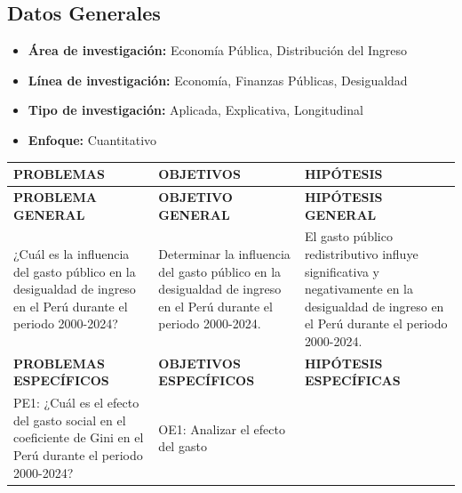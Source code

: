 \documentclass[
  man,
  floatsintext,
  longtable,
  a4paper,
  nolmodern,
  notxfonts,
  notimes,
  12pt,
  colorlinks=true,linkcolor=blue,citecolor=blue,urlcolor=blue]{apa7}
\providecommand{\tightlist}{%
  \setlength{\itemsep}{0pt}\setlength{\parskip}{0pt}}
\newcounter{none} %
\begin{document}
\subsection{Datos Generales}\label{datos-generales-1}

\begin{itemize}
\tightlist
\item
  \textbf{Área de investigación:} Economía Pública, Distribución del
  Ingreso
\item
  \textbf{Línea de investigación:} Economía, Finanzas Públicas,
  Desigualdad
\item
  \textbf{Tipo de investigación:} Aplicada, Explicativa, Longitudinal
\item
  \textbf{Enfoque:} Cuantitativo
\end{itemize}

{\def\LTcaptype{none} %
\begin{longtable}[]{@{}
  >{\raggedright\arraybackslash}p{}
  >{\raggedright\arraybackslash}p{}
  >{\raggedright\arraybackslash}p{}@{}}
\toprule\noalign{}
\begin{minipage}[b]{\linewidth}\raggedright
PROBLEMAS
\end{minipage} & \begin{minipage}[b]{\linewidth}\raggedright
OBJETIVOS
\end{minipage} & \begin{minipage}[b]{\linewidth}\raggedright
HIPÓTESIS
\end{minipage} \\
\midrule\noalign{}
\endhead
\bottomrule\noalign{}
\endlastfoot
\textbf{PROBLEMA GENERAL} & \textbf{OBJETIVO GENERAL} &
\textbf{HIPÓTESIS GENERAL} \\
¿Cuál es la influencia del gasto público en la desigualdad de ingreso en
el Perú durante el periodo 2000-2024? & Determinar la influencia del
gasto público en la desigualdad de ingreso en el Perú durante el periodo
2000-2024. & El gasto público redistributivo influye significativa y
negativamente en la desigualdad de ingreso en el Perú durante el periodo
2000-2024. \\
\textbf{PROBLEMAS ESPECÍFICOS} & \textbf{OBJETIVOS ESPECÍFICOS} &
\textbf{HIPÓTESIS ESPECÍFICAS} \\
PE1: ¿Cuál es el efecto del gasto social en el coeficiente de Gini en el
Perú durante el periodo 2000-2024? & OE1: Analizar el efecto del gasto

\end{longtable}}
\end{document}

